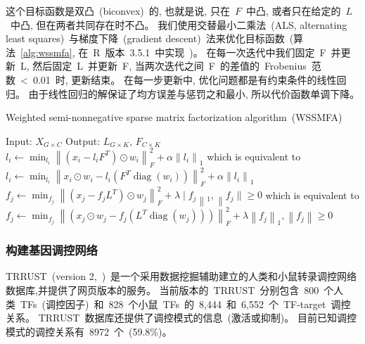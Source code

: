 这个目标函数是双凸~(biconvex)~的, 也就是说, 只在~$F$~中凸, 或者只在给定的~$L$~中凸, 但在两者共同存在时不凸。
我们使用交替最小二乘法~(ALS, alternating least squares)~与梯度下降~(gradient descent)~法来优化目标函数~(算法~\ref{alg:wssmfa}, 在~R~版本~3.5.1~中实现~\cite{goeman2012penalized,goeman2010l1})。
在每一次迭代中我们固定~F~并更新~L, 然后固定~L~并更新~F, 当两次迭代之间~F~的差值的~Frobenius~范数~<~0.01~时, 更新结束。
在每一步更新中, 优化问题都是有约束条件的线性回归。
由于线性回归的解保证了均方误差与惩罚之和最小, 所以代价函数单调下降。
\begin{algorithm}
    \caption{Weighted semi-nonnegative sparse matrix factorization algorithm~(WSSMFA)}
    \label{alg:wssmfa}
    \begin{algorithmic}[1]
        \State Input: $X_{G \times C}$                                   
        \State Output: $L_{G \times K}$, $F_{C \times K}$                
                \State $l_{i} \leftarrow \min _{l_{i}}\left\|\left(x_{i}-l_{i} F^{T}\right) \odot w_{i}\right\|_{F}^{2}+\alpha\left\|l_{i}\right\|_{1}$
                \State which is equivalent to 
                \State $l_{i} \leftarrow \min _{l_{i}}\left\|x_{i} \odot w_{i}-l_{i}\left(F^{T} \operatorname{diag}\left(w_{i}\right)\right)\right\|_{F}^{2}+\alpha\left\|l_{i}\right\|_{1}$
            \EndFor
                \State $f_{j} \leftarrow \min _{f_{j}}\left\|\left(x_{j}-f_{j} L^{T}\right) \odot w_{j}\right\|_{F}^{2}+\lambda \mid f_{j}\left\|_{1},\right\| f_{j} \| \geq 0$
                \State which is equivalent to 
                \State $f_{j} \leftarrow \min _{f_{j}}\left\|\left(x_{j} \odot w_{j}-f_{j}\left(L^{T} \operatorname{diag}\left(w_{j}\right)\right)\right)\right\|_{F}^{2}+\lambda\left\|f_{j}\right\|_{1},\left\|f_{j}\right\| \geq 0$
            \EndFor
        \EndWhile           
  \end{algorithmic}
\end{algorithm}

\subsubsection{构建基因调控网络}
TRRUST~(version 2,~\cite{han2018trrust})~是一个采用数据挖掘辅助建立的人类和小鼠转录调控网络数据库,并提供了网页版本的服务。
当前版本的~TRRUST~分别包含~800~个人类~TFs~(调控因子)~和~828~个小鼠~TFs~的~8,444~和~6,552~个~TF-target~调控关系。
TRRUST~数据库还提供了调控模式的信息~(激活或抑制)。
目前已知调控模式的调控关系有~8972~个~(59.8\%)。

